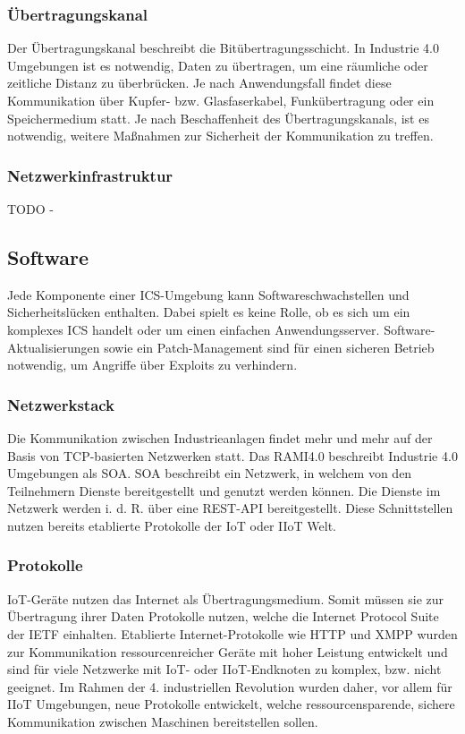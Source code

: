 \subsubsection{Übertragungskanal}
Der Übertragungskanal beschreibt die Bitübertragungsschicht. In Industrie 4.0 Umgebungen ist es notwendig, Daten zu übertragen, um eine räumliche oder zeitliche Distanz zu überbrücken. Je nach Anwendungsfall findet diese Kommunikation über Kupfer- bzw. Glasfaserkabel, Funkübertragung oder ein Speichermedium statt. Je nach Beschaffenheit des Übertragungskanals, ist es notwendig, weitere Maßnahmen zur Sicherheit der Kommunikation zu treffen. 

\subsubsection{Netzwerkinfrastruktur}
TODO -

\subsection{Software}
Jede Komponente einer \ac{ICS}-Umgebung kann Softwareschwachstellen und Sicherheitslücken enthalten. Dabei spielt es keine Rolle, ob es sich um ein komplexes \ac{ICS} handelt oder um einen einfachen Anwendungsserver. Software-Aktualisierungen sowie ein Patch-Management sind für einen sicheren Betrieb notwendig, um Angriffe über Exploits zu verhindern.

\subsubsection{Netzwerkstack}
Die Kommunikation zwischen Industrieanlagen findet mehr und mehr auf der Basis von TCP-basierten Netzwerken statt. Das \ac{RAMI4.0} beschreibt Industrie 4.0 Umgebungen als \ac{SOA}. \ac{SOA} beschreibt ein Netzwerk, in welchem von den Teilnehmern Dienste bereitgestellt und genutzt werden können. Die Dienste im Netzwerk werden i. d. R. über eine \ac{REST}-\ac{API} bereitgestellt. Diese Schnittstellen nutzen bereits etablierte Protokolle der \ac{IoT} oder \ac{IIoT} Welt.

\subsubsection{Protokolle}
\ac{IoT}-Geräte nutzen das Internet als Übertragungsmedium. Somit müssen sie zur Übertragung ihrer Daten Protokolle nutzen, welche die Internet Protocol Suite der \ac{IETF} einhalten. Etablierte Internet-Protokolle wie HTTP und XMPP wurden zur Kommunikation ressourcenreicher Geräte mit hoher Leistung entwickelt und sind für viele Netzwerke mit \ac{IoT}- oder \ac{IIoT}-Endknoten zu komplex, bzw. nicht geeignet. Im Rahmen der 4. industriellen Revolution wurden daher, vor allem für \ac{IIoT} Umgebungen, neue Protokolle entwickelt, welche ressourcensparende, sichere Kommunikation zwischen Maschinen bereitstellen sollen. 

